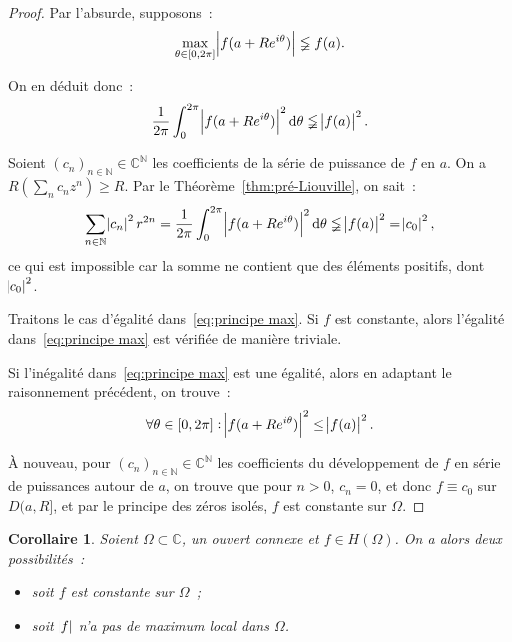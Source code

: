 \documentclass{report}
\newtheorem{cor}[thm]{Corollaire}
\theoremstyle{definition}
\theoremstyle{remark}
\numberwithin{equation}{section}
\newcommand{\C}{\mathbb C}
\newcommand{\N}{\mathbb N}
\begin{document}
			\begin{proof} Par l'absurde, supposons~:
			\begin{equation}
				\max_{\theta \in [0, 2\pi]}\abs {f(a+Re^{i\theta})} \lneqq f(a).
			\end{equation}

			On en déduit donc~:
			\begin{equation}
				\frac 1{2\pi}\int_0^{2\pi}\abs {f(a+Re^{i\theta})}^2\dif \theta \lneqq \abs {f(a)}^2.
			\end{equation}

			Soient $(c_n)_{n \in \N} \in \C^\N$ les coefficients de la série de puissance de $f$ en $a$. On a $R\left(\sum_nc_nz^n\right) \geq R$. Par le
			Théorème~\ref{thm:pré-Liouville}, on sait~:
			\begin{equation}
				\sum_{n \in \N}\abs {c_n}^2r^{2n} = \frac 1{2\pi}\int_0^{2\pi}\abs {f(a+Re^{i\theta})}^2\dif \theta \lneqq \abs {f(a)}^2 = \abs {c_0}^2,
			\end{equation}
			ce qui est impossible car la somme ne contient que des éléments positifs, dont $\abs {c_0}^2$.

			Traitons le cas d'égalité dans~\eqref{eq:principe max}. Si $f$ est constante, alors l'égalité dans~\eqref{eq:principe max} est vérifiée de manière triviale.

			Si l'inégalité dans~\eqref{eq:principe max} est une égalité, alors en adaptant le raisonnement précédent, on trouve~:
			\begin{equation}
				\forall \theta \in [0, 2\pi] : \abs {f(a+Re^{i\theta})}^2 \leq \abs {f(a)}^2.
			\end{equation}

			À nouveau, pour $(c_n)_{n \in \N} \in \C^\N$ les coefficients du développement de $f$ en série de puissances autour de $a$, on trouve que pour $n > 0$,
			$c_n = 0$, et donc $f \equiv c_0$ sur $D(a, R]$, et par le principe des zéros isolés, $f$ est constante sur $\Omega$.
			\end{proof}

			\begin{cor} Soient $\Omega \subset \C$, un ouvert connexe et $f \in H(\Omega)$. On a alors deux possibilités~:
			\begin{itemize}
				\item soit $f$ est constante sur $\Omega$~;
				\item soit $\abs f$ n'a pas de maximum local dans $\Omega$.
			\end{itemize}
			\end{cor}
\end{document}
